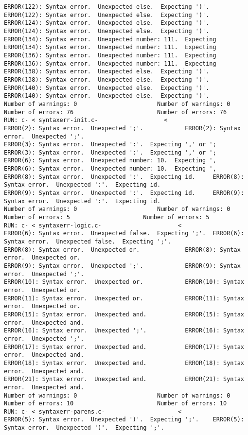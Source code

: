 \documentclass[12pt]{book}
\begin{document}
\begin{lstlisting}
ERROR(122): Syntax error.  Unexpected else.  Expecting ')'.	ERROR(122): Syntax error.  Unexpected else.  Expecting ')'.
ERROR(124): Syntax error.  Unexpected else.  Expecting ')'.	ERROR(124): Syntax error.  Unexpected else.  Expecting ')'.
ERROR(134): Syntax error.  Unexpected number: 111.  Expecting	ERROR(134): Syntax error.  Unexpected number: 111.  Expecting
ERROR(136): Syntax error.  Unexpected number: 111.  Expecting	ERROR(136): Syntax error.  Unexpected number: 111.  Expecting
ERROR(138): Syntax error.  Unexpected else.  Expecting ')'.	ERROR(138): Syntax error.  Unexpected else.  Expecting ')'.
ERROR(140): Syntax error.  Unexpected else.  Expecting ')'.	ERROR(140): Syntax error.  Unexpected else.  Expecting ')'.
Number of warnings: 0						Number of warnings: 0
Number of errors: 76						Number of errors: 76
RUN: c- < syntaxerr-init.c-				      <
ERROR(2): Syntax error.  Unexpected ';'.			ERROR(2): Syntax error.  Unexpected ';'.
ERROR(3): Syntax error.  Unexpected ':'.  Expecting ',' or ';	ERROR(3): Syntax error.  Unexpected ':'.  Expecting ',' or ';
ERROR(6): Syntax error.  Unexpected number: 10.  Expecting ',	ERROR(6): Syntax error.  Unexpected number: 10.  Expecting ',
ERROR(8): Syntax error.  Unexpected ':'.  Expecting id.		ERROR(8): Syntax error.  Unexpected ':'.  Expecting id.
ERROR(9): Syntax error.  Unexpected ':'.  Expecting id.		ERROR(9): Syntax error.  Unexpected ':'.  Expecting id.
Number of warnings: 0						Number of warnings: 0
Number of errors: 5						Number of errors: 5
RUN: c- < syntaxerr-logic.c-				      <
ERROR(6): Syntax error.  Unexpected false.  Expecting ';'.	ERROR(6): Syntax error.  Unexpected false.  Expecting ';'.
ERROR(8): Syntax error.  Unexpected or.				ERROR(8): Syntax error.  Unexpected or.
ERROR(9): Syntax error.  Unexpected ';'.			ERROR(9): Syntax error.  Unexpected ';'.
ERROR(10): Syntax error.  Unexpected or.			ERROR(10): Syntax error.  Unexpected or.
ERROR(11): Syntax error.  Unexpected or.			ERROR(11): Syntax error.  Unexpected or.
ERROR(15): Syntax error.  Unexpected and.			ERROR(15): Syntax error.  Unexpected and.
ERROR(16): Syntax error.  Unexpected ';'.			ERROR(16): Syntax error.  Unexpected ';'.
ERROR(17): Syntax error.  Unexpected and.			ERROR(17): Syntax error.  Unexpected and.
ERROR(18): Syntax error.  Unexpected and.			ERROR(18): Syntax error.  Unexpected and.
ERROR(21): Syntax error.  Unexpected and.			ERROR(21): Syntax error.  Unexpected and.
Number of warnings: 0						Number of warnings: 0
Number of errors: 10						Number of errors: 10
RUN: c- < syntaxerr-parens.c-				      <
ERROR(5): Syntax error.  Unexpected ')'.  Expecting ';'.	ERROR(5): Syntax error.  Unexpected ')'.  Expecting ';'.

\end{lstlisting}
\end{document}
